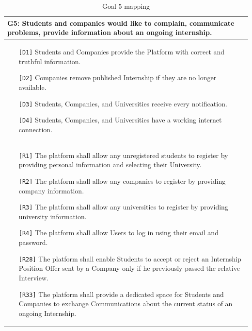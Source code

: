 \begin{table}[H]
    \centering
    \begin{tabular}{|p{15cm}|}
        \hline
        \textbf{G5:} Students and companies would like to complain, communicate problems, provide information about an ongoing internship. \\ \hline
        \begin{itemize}
            \item[\texttt{[D1]}] Students and Companies provide the Platform with correct and truthful information.
            \item[\texttt{[D2]}] Companies remove published Internship if they are no longer available.
            \item[\texttt{[D3]}] Students, Companies, and Universities receive every notification.
            \item[\texttt{[D4]}] Students, Companies, and Universities have a working internet connection.
        \end{itemize} \\ \hline
        \begin{itemize}
            \item[\texttt{[R1]}] The platform shall allow any unregistered students to register by providing personal information and selecting their University.
            \item[\texttt{[R2]}] The platform shall allow any companies to register by providing company information.
            \item[\texttt{[R3]}] The platform shall allow any universities to register by providing university information.
            \item[\texttt{[R4]}] The platform shall allow Users to log in using their email and password.
            \item[\texttt{[R28]}] The platform shall enable Students to accept or reject an Internship Position Offer sent by a Company only if he previously passed the relative Interview.
            \item[\texttt{[R33]}] The platform shall provide a dedicated space for Students and Companies to exchange Communications about the current status of an ongoing Internship.
        \end{itemize} \\ \hline
    \end{tabular}
    \caption{Goal 5 mapping}
    \label{tab:G5}
\end{table}

